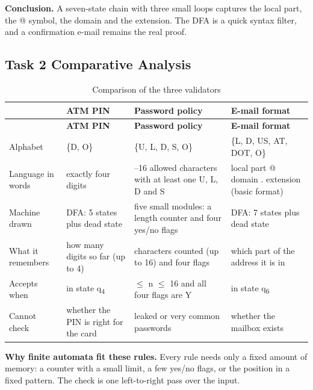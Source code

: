 \documentclass[12pt,a4paper]{article}
\begin{document}
\textbf{Conclusion.} A seven-state chain with three small loops captures the local part, the @ symbol, the domain and the extension. The DFA is a quick syntax filter, and a confirmation e-mail remains the real proof.

\subsection{Task 2 Comparative Analysis}

{\footnotesize
\begin{longtable}{|>{\raggedright\arraybackslash}p{}|>{\raggedright\arraybackslash}p{}|>{\raggedright\arraybackslash}p{}|>{\raggedright\arraybackslash}p{}|}
\caption[Comparison of the three validators]{Comparison of the three validators}\label{tab:t2_compare}\\
\hline
\rowcolor{hdr} & \textbf{ATM PIN} & \textbf{Password policy} & \textbf{E-mail format}\\ \hline
\endfirsthead
\hline
\rowcolor{hdr} & \textbf{ATM PIN} & \textbf{Password policy} & \textbf{E-mail format}\\ \hline
\endhead
Alphabet & \{D, O\} & \{U, L, D, S, O\} & \{L, D, US, AT, DOT, O\}\\ \hline
Language in words & exactly four digits & 8--16 allowed characters with at least one U, L, D and S & local part @ domain . extension (basic format)\\ \hline
Machine drawn & DFA: 5 states plus dead state & five small modules: a length counter and four yes/no flags & DFA: 7 states plus dead state\\ \hline
What it remembers & how many digits so far (up to 4) & characters counted (up to 16) and four flags & which part of the address it is in\\ \hline
Accepts when & in state q\textsubscript{4} & 8 \ensuremath{\leq} n \ensuremath{\leq} 16 and all four flags are Y & in state q\textsubscript{6}\\ \hline
Cannot check & whether the PIN is right for the card & leaked or very common passwords & whether the mailbox exists\\ \hline
\end{longtable}}

\textbf{Why finite automata fit these rules.} Every rule needs only a fixed amount of memory: a counter with a small limit, a few yes/no flags, or the position in a fixed pattern. The check is one left-to-right pass over the input.
\end{document}
